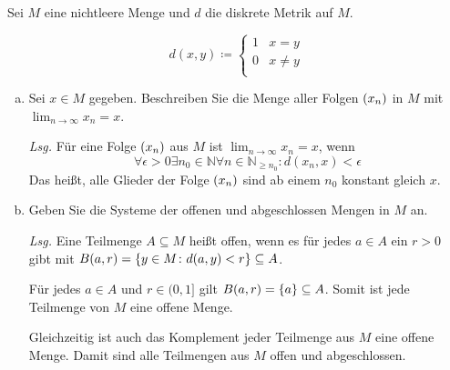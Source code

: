 \documentclass{article}
\begin{document}
Sei $M$ eine nichtleere Menge und $d$ die diskrete Metrik auf $M$.

\[
  d(x, y) \coloneqq \begin{cases}
    1 & x = y \\
    0 & x \ne y \\
  \end{cases}
\]

\begin{enumerate}[a)]
\item Sei $x \in M$ gegeben. Beschreiben Sie die Menge aller Folgen $\qty(x_n)$ in $M$
  mit $\lim_{n \to \infty} x_n = x$.

  \textit{Lsg.} Für eine Folge $\qty(x_n)$ aus $M$ ist $\lim_{n \to \infty} x_n = x$,
  wenn
  \[
    \forall \epsilon > 0 \exists n_0 \in \mathbb{N} \forall n \in \mathbb{N}_{\geq n_0} \colon d(x_n, x) < \epsilon
  \]
  Das heißt, alle Glieder der Folge $\qty(x_n)$ sind ab einem $n_0$ konstant gleich $x$.
\newpage
\item Geben Sie die Systeme der offenen und abgeschlossen Mengen in $M$ an.

  \textit{Lsg.} Eine Teilmenge $A \subseteq M$ heißt offen, wenn es für jedes $a \in A$
  ein $r > 0$ gibt mit $B(a, r) = \qty{y \in M \colon d(a, y) < r} \subseteq A$.

  Für jedes $a \in A$ und $r \in (0, 1]$ gilt $B(a, r) = \qty{a} \subseteq{A}$.
  Somit ist jede Teilmenge von $M$ eine offene Menge.

  Gleichzeitig ist auch das Komplement jeder Teilmenge aus $M$ eine offene Menge.
  Damit sind alle Teilmengen aus $M$ offen und abgeschlossen.
\end{enumerate}
\end{document}

